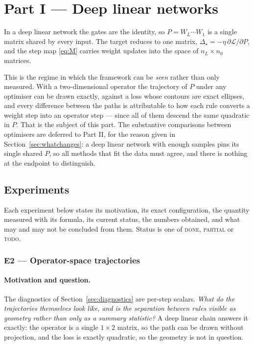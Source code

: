 \documentclass{article} %
\theoremstyle{plain}
\theoremstyle{definition}
\theoremstyle{remark}
\begin{document}
\section{Part I --- Deep linear networks}
\label{sec:linear}

In a deep linear network the gates are the identity, so $P = W_L \cdots W_1$ is a single matrix
shared by every input. The target reduces to one matrix, $\Delta_\star = -\eta\,
\partial\mathcal{L}/\partial P$, and the step map \eqref{eq:M} carries weight updates into the
space of $n_L \times n_0$ matrices.

This is the regime in which the framework can be \emph{seen} rather than only measured. With a
two-dimensional operator the trajectory of $P$ under any optimiser can be drawn exactly, against
a loss whose contours are exact ellipses, and every difference between the paths is attributable
to how each rule converts a weight step into an operator step --- since all of them descend the
same quadratic in $P$. That is the subject of this part. The substantive comparisons between
optimisers are deferred to Part II, for the reason given in Section~\ref{sec:whatchanges}: a deep
linear network with enough samples pins its single shared $P$, so all methods that fit the data
must agree, and there is nothing at the endpoint to distinguish.

\subsection{Experiments}
\label{sec:linear-exp}

Each experiment below states its motivation, its exact configuration, the quantity measured with
its formula, its current status, the numbers obtained, and what may and may not be concluded from
them. Status is one of \textsc{done}, \textsc{partial} or \textsc{todo}.

\subsubsection{E2 --- Operator-space trajectories}
\label{sec:e2}

\paragraph{Motivation and question.}
The diagnostics of Section~\ref{sec:diagnostics} are per-step scalars. \emph{What do the
trajectories themselves look like, and is the separation between rules visible as geometry rather
than only as a summary statistic?} A deep linear chain answers it exactly: the operator is a single
$1\times2$ matrix, so the path can be drawn without projection, and the loss is exactly quadratic,
so the geometry is not in question.
\end{document}
